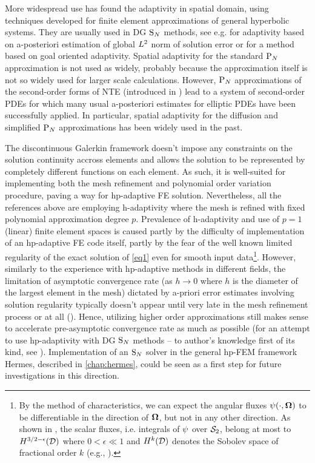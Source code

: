 {More widespread use has found the adaptivity in spatial domain, using techniques developed for finite element
approximations of general hyperbolic systems. They are usually used in DG $\SN$ methods, see e.g.
\cite{Fournier,Duo,ragusa2010two} for adaptivity based on a-posteriori estimation of global $\Lp[2]$ norm of solution
error or \cite{LathouwersGoal, Wang2} for a method based on goal oriented adaptivity. Spatial adaptivity for the
standard $\PN$ approximation is not used as widely, probably because the approximation itself is not so widely used for
larger scale calculations. However, $\PN$ approximations of the second-order forms of NTE (introduced in
) lead to a system of second-order PDEs for which many usual a-posteriori estimates for elliptic 
PDEs have been successfully applied. In particular, spatial adaptivity for the diffusion and simplified $\PN$
approximations has been widely used in the past.
 
The discontinuous Galerkin framework doesn't impose any constraints on the solution
continuity accross elements and allows the solution to be represented by completely different functions on each element.
As such, it is well-suited for implementing both the mesh refinement and polynomial order variation procedure, paving a
way for hp-adaptive FE solution.
Nevertheless, all the references above are employing h-adaptivity where the mesh is refined with fixed polynomial
approximation degree $p$. Prevalence of h-adaptivity and use of $p=1$ (linear) finite element spaces is caused partly
by the difficulty of implementation of an hp-adaptive FE code itself, partly by the fear of the well known limited
regularity of the exact solution of \eqref{eq1} even for smooth input data\footnote{By the method of characteristics, we
can expect the angular fluxes $\angflux(\cdot,\bomega)$ to be differentiable in the direction of $\bomega$, but not in
any other direction. As shown in \cite{Johnson}, the scalar fluxes, i.e. integrals of $\angflux$ over $\Sphere$, belong
at most to $H^{3/2-\epsilon}(\VV)$ where $0 < \epsilon \ll 1$ and $H^{k}(\VV)$ denotes the Sobolev space of fractional
order $k$ (e.g., \cite[Sec. 9.2]{demkowicz}).}.
However, similarly to the experience with hp-adaptive methods in different fields, the limitation of asymptotic
convergence rate (as $h\to 0$ where $h$ is the diameter of the largest element in the mesh) dictated by a-priori error
estimates involving solution regularity typically doesn't appear until very late in the mesh refinement process or at
all (\cite{wang2009convergence}). Hence, utilizing higher order approximations still makes sense to accelerate
pre-asymptotic convergence rate as much as possible (for an attempt to use hp-adaptivity with DG $\SN$ methods -- to
author's knowledge first of its kind, see \cite{FournierDGHP}). Implementation of an $\SN$ solver in the general hp-FEM
framework Hermes, described in \cref{chap:hermes}, could be seen as a first step for future investigations in this
direction.
}


